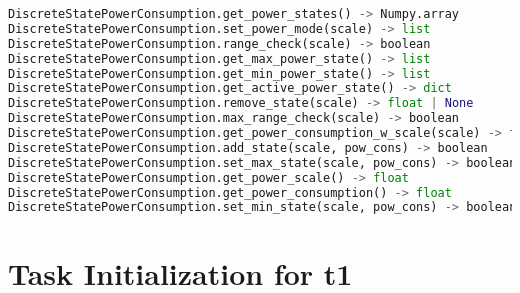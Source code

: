 \documentclass[]{scrartcl}
\begin{document}
\begin{lstlisting}[language=Python, frame=single, label={lst:cpu2memberFunctionsPowerDiscrete}, caption={The member functions for \textsf{DiscreteStatePowerConsumption} module.}]
DiscreteStatePowerConsumption.get_power_states() -> Numpy.array
DiscreteStatePowerConsumption.set_power_mode(scale) -> list
DiscreteStatePowerConsumption.range_check(scale) -> boolean
DiscreteStatePowerConsumption.get_max_power_state() -> list
DiscreteStatePowerConsumption.get_min_power_state() -> list
DiscreteStatePowerConsumption.get_active_power_state() -> dict
DiscreteStatePowerConsumption.remove_state(scale) -> float | None
DiscreteStatePowerConsumption.max_range_check(scale) -> boolean
DiscreteStatePowerConsumption.get_power_consumption_w_scale(scale) -> float
DiscreteStatePowerConsumption.add_state(scale, pow_cons) -> boolean
DiscreteStatePowerConsumption.set_max_state(scale, pow_cons) -> boolean
DiscreteStatePowerConsumption.get_power_scale() -> float
DiscreteStatePowerConsumption.get_power_consumption() -> float
DiscreteStatePowerConsumption.set_min_state(scale, pow_cons) -> boolean
\end{lstlisting}
        
            
\section{Task Initialization for \textsf{t1}}
        
\end{document}
